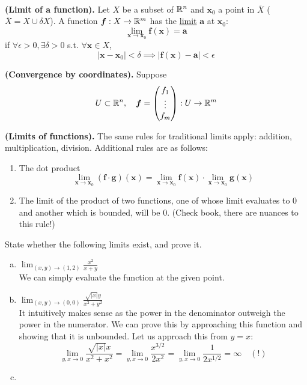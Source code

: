 \\

\begin{defn}
\textbf{(Limit of a function).} Let $X$ be a subset of $\mathbb{R}^n$ and $\bm{x}_0$ a point in $\overline{X}$ ($\overline{X}=X\cup \delta X$). A function $\bm{f} : X \rightarrow \mathbb{R}^m$ has the \ul{limit}
 $\bm{a}$ at $\bm{x}_0$:
\[\lim_{\bm{x}\rightarrow \bm{x}_0}\bm{f}(\bm{x}) = \bm{a}\]
if $\forall \epsilon > 0, \exists\delta > 0$ s.t. $\forall\bm{x}\in X$,
\[|\bm{x}-\bm{x}_0|<\delta \implies |\bm{f}(\bm{x})-\bm{a}|<\epsilon\]
\end{defn}

\begin{proposition}
\textbf{(Convergence by coordinates).} Suppose
\[U\subset \mathbb{R}^n, \quad \bm{f}=\begin{pmatrix} f_1 \\ \vdots \\ f_m \end{pmatrix}: U\rightarrow \mathbb{R}^m\]
\end{proposition}

\begin{theorem}
  \textbf{(Limits of functions).} The same rules for traditional limits apply: addition, multiplication, division. Additional rules are as follows:
  \begin{enumerate}
    \item The dot product
    \[\lim_{\bm{x}\to\bm{x}_0}(\bm{f} \cdot \bm{g})(\bm{x})=\lim_{\bm{x}\to\bm{x}_0}\bm{f}(\bm{x})\cdot \lim_{\bm{x}\to\bm{x}_0}\bm{g}(\bm{x})\]
    \item The limit of the product of two functions, one of whose limit evaluates to $0$ and another which is bounded, will be $0$. (Check book, there are nuances to this rule!)
  \end{enumerate}
\end{theorem}

 State whether the following limits exist, and prove it.
\begin{enumerate}[a.]
  \item $\displaystyle \lim_{(x,y)\rightarrow (1,2)} \frac{x^2}{x+y}$\\
   We can simply evaluate the function at the given point. 
  
  \item $\displaystyle \lim_{(x,y)\rightarrow (0,0)} \frac{\sqrt{|x|}y}{x^2+y^2}$\\
   It intuitively makes sense as the power in the denominator outweigh the power in the numerator. We can prove this by approaching this function and showing that it is unbounded. Let us approach this from $y=x$: 
  \[\lim_{y,x\to 0}\frac{\sqrt{|x|}x}{x^2+x^2}=\lim_{y,x\to 0}\frac{x^{3/2}}{2x^2}=\lim_{y,x\to 0}\frac{1}{2x^{1/2}}=\infty\quad (!)\]
  \item 

\end{enumerate}
